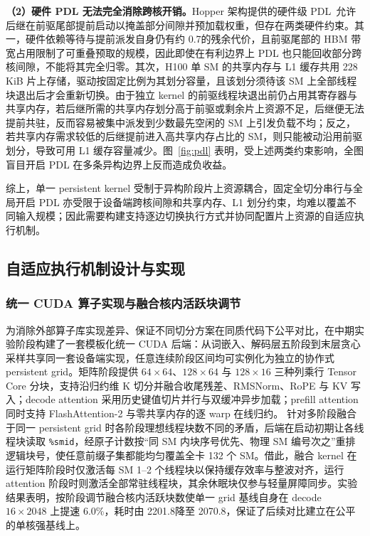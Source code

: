 \textbf{（2）硬件 PDL 无法完全消除跨核开销。}Hopper 架构提供的硬件级 PDL~\pPDL 允许后继在前驱尾部提前启动以掩盖部分间隙并预加载权重，但存在两类硬件约束。其一，硬件依赖等待与提前派发自身仍有约 0.7\us 的残余代价，且前驱尾部的 HBM 带宽占用限制了可重叠预取的规模，因此即使在有利边界上 PDL 也只能回收部分跨核间隙，不能将其完全归零。其次，H100 单 SM 的共享内存与 L1 缓存共用 228\,KiB 片上存储，驱动按固定比例为其划分容量，且该划分须待该 SM 上全部线程块退出后才会重新切换。由于独立 kernel 的前驱线程块退出前仍占用其寄存器与共享内存，若后继所需的共享内存划分高于前驱或剩余片上资源不足，后继便无法提前共驻，反而容易被集中派发到少数最先空闲的 SM 上引发负载不均；反之，若共享内存需求较低的后继提前进入高共享内存占比的 SM，则只能被动沿用前驱划分，导致可用 L1 缓存容量减少。图~\ref{fig:pdl} 表明，受上述两类约束影响，全图盲目开启 PDL 在多条异构边界上反而造成负收益。

综上，单一 persistent kernel 受制于异构阶段片上资源耦合，固定全切分串行与全局开启 PDL 亦受限于设备端跨核间隙和共享内存、L1 划分约束，均难以覆盖不同输入规模；因此需要构建支持逐边切换执行方式并协同配置片上资源的自适应执行机制。

\subsection{自适应执行机制设计与实现}\label{sec:mech}

\subsubsection{统一 CUDA 算子实现与融合核内活跃块调节}\label{sec:method}

为消除外部算子库实现差异、保证不同切分方案在同质代码下公平对比，在中期实验阶段构建了一套模板化统一 CUDA 后端：从词嵌入、解码层五阶段到末层贪心采样共享同一套设备端实现，任意连续阶段区间均可实例化为独立的协作式 persistent grid。矩阵阶段提供 $64\times 64$、$128\times 64$ 与 $128\times 16$ 三种列乘行 Tensor Core 分块，支持沿归约维 K 切分并融合收尾残差、RMSNorm、RoPE 与 KV 写入；decode attention 采用历史键值切片并行与双缓冲异步加载；prefill attention 同时支持 FlashAttention-2 与零共享内存的逐 warp 在线归约。
针对多阶段融合于同一 persistent grid 时各阶段理想线程块数不同的矛盾，后端在启动初期让各线程块读取 \texttt{\%smid}，经原子计数按“同 SM 内块序号优先、物理 SM 编号次之”重排逻辑块号，使任意前缀子集都能均匀覆盖全卡 132 个 SM。借此，融合 kernel 在运行矩阵阶段时仅激活每 SM 1--2 个线程块以保持缓存效率与整波对齐，运行 attention 阶段时则激活全部常驻线程块，其余休眠块仅参与轻量屏障同步。实验结果表明，按阶段调节融合核内活跃块数使单一 grid 基线自身在 decode $16\times 2048$ 上提速 6.0\%，耗时由 2201.8\us 降至 2070.8\us，保证了后续对比建立在公平的单核强基线上。


